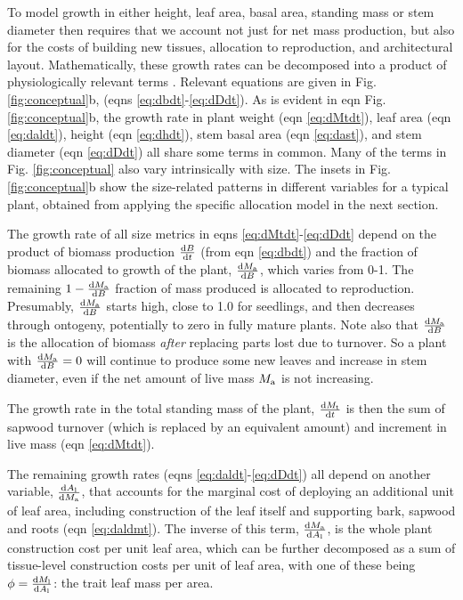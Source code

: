 \documentclass[a4paper,11pt]{article}
\begin{document}
To model growth in either height, leaf area, basal area, standing mass or stem diameter then requires that we account not just for net mass production, but also for the costs of building new tissues, allocation to reproduction, and architectural layout. Mathematically, these growth rates can be decomposed into a product of physiologically relevant terms \citep{Falster-2011, Gibert-2016}. Relevant equations are given in Fig. \ref{fig:conceptual}b, (eqns \ref{eq:dbdt}-\ref{eq:dDdt}). As is evident in eqn  Fig. \ref{fig:conceptual}b, the growth rate in plant weight (eqn \ref{eq:dMtdt}), leaf area (eqn \ref{eq:daldt}), height (eqn \ref{eq:dhdt}), stem basal area (eqn \ref{eq:dast}), and stem diameter (eqn \ref{eq:dDdt}) all share some terms in common. Many of the terms in Fig. \ref{fig:conceptual} also vary intrinsically with size. The insets in Fig. \ref{fig:conceptual}b show the size-related patterns in different variables for a typical plant, obtained from applying the specific allocation model in the next section.

The growth rate of all size metrics in eqns \ref{eq:dMtdt}-\ref{eq:dDdt} depend on the product of biomass production $\frac{{\rm d}B} {{\rm d}t}$ (from eqn \ref{eq:dbdt}) and the fraction of biomass allocated to growth of the plant, $\frac{{\rm d}M_{\rm a}}{{\rm d}B}$, which varies from 0-1. The remaining  $1- \frac{{\rm d}M_{\rm a}}{{\rm d}B}$ fraction of mass produced is allocated to reproduction. Presumably, $\frac{{\rm d}M_{\rm a}}{{\rm d}B}$ starts high, close to 1.0 for seedlings, and then decreases through ontogeny, potentially to zero in fully mature plants. Note also that $\frac{{\rm d}M_{\rm a}}{{\rm d}B}$ is the allocation of biomass \emph{after} replacing parts lost due to turnover. So a plant with $\frac{{\rm d}M_{\rm a}}{{\rm d}B}=0$ will continue to produce some new leaves and increase in stem diameter, even if the net amount of live mass $M_{\rm a}$ is not increasing.

The growth rate in the total standing mass of the plant, $\frac{{\rm d}M_{{\rm t}}}{{\rm d}t}$ is then the sum of sapwood turnover (which is replaced by an equivalent amount) and increment in live mass (eqn \ref{eq:dMtdt}).

The remaining growth rates (eqns \ref{eq:daldt}-\ref{eq:dDdt}) all depend on another variable, $\frac{{\rm d}A_{\rm l}} {{\rm d}M_{\rm a}}$, that accounts for the marginal cost of deploying an additional unit of leaf area, including construction of the leaf itself and supporting  bark, sapwood and roots (eqn \ref{eq:daldmt}). The inverse of this term, $\frac{{\rm d}M_{\rm a} }{{\rm d}A_{\rm l}}$, is the whole plant construction cost per unit leaf area, which can be further decomposed as a sum of tissue-level construction costs per unit of leaf area, with one of these being $\phi = \frac{{\rm d}M_{\rm l} }{{\rm d}A_{\rm l}}$: the trait leaf mass per area.
\end{document}
